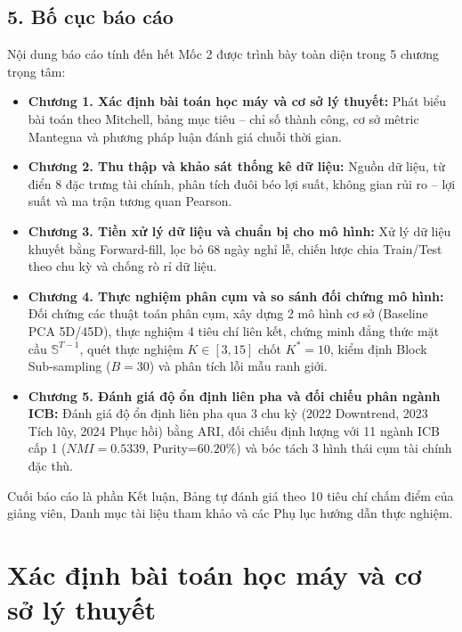 \documentclass[12pt,a4paper,oneside,openany]{report}
\begin{document}
\section*{5. Bố cục báo cáo}
Nội dung báo cáo tính đến hết Mốc 2 được trình bày toàn diện trong 5 chương trọng tâm:
\begin{itemize}
  \item \textbf{Chương 1. Xác định bài toán học máy và cơ sở lý thuyết:} Phát biểu bài toán theo Mitchell, bảng mục tiêu -- chỉ số thành công, cơ sở mêtric Mantegna và phương pháp luận đánh giá chuỗi thời gian.
  \item \textbf{Chương 2. Thu thập và khảo sát thống kê dữ liệu:} Nguồn dữ liệu, từ điển 8 đặc trưng tài chính, phân tích đuôi béo lợi suất, không gian rủi ro -- lợi suất và ma trận tương quan Pearson.
  \item \textbf{Chương 3. Tiền xử lý dữ liệu và chuẩn bị cho mô hình:} Xử lý dữ liệu khuyết bằng Forward-fill, lọc bỏ 68 ngày nghỉ lễ, chiến lược chia Train/Test theo chu kỳ và chống rò rỉ dữ liệu.
  \item \textbf{Chương 4. Thực nghiệm phân cụm và so sánh đối chứng mô hình:} Đối chứng các thuật toán phân cụm, xây dựng 2 mô hình cơ sở (Baseline PCA 5D/45D), thực nghiệm 4 tiêu chí liên kết, chứng minh đẳng thức mặt cầu $\mathbb{S}^{T-1}$, quét thực nghiệm $K \in [3, 15]$ chốt $K^*=10$, kiểm định Block Sub-sampling ($B=30$) và phân tích lỗi mẫu ranh giới.
  \item \textbf{Chương 5. Đánh giá độ ổn định liên pha và đối chiếu phân ngành ICB:} Đánh giá độ ổn định liên pha qua 3 chu kỳ (2022 Downtrend, 2023 Tích lũy, 2024 Phục hồi) bằng ARI, đối chiếu định lượng với 11 ngành ICB cấp 1 ($NMI=0.5339$, Purity=$60.20\%$) và bóc tách 3 hình thái cụm tài chính đặc thù.
\end{itemize}
Cuối báo cáo là phần Kết luận, Bảng tự đánh giá theo 10 tiêu chí chấm điểm của giảng viên, Danh mục tài liệu tham khảo và các Phụ lục hướng dẫn thực nghiệm.

\chapter{Xác định bài toán học máy và cơ sở lý thuyết}
\label{chap:xacdinhbaitoan}
\end{document}
